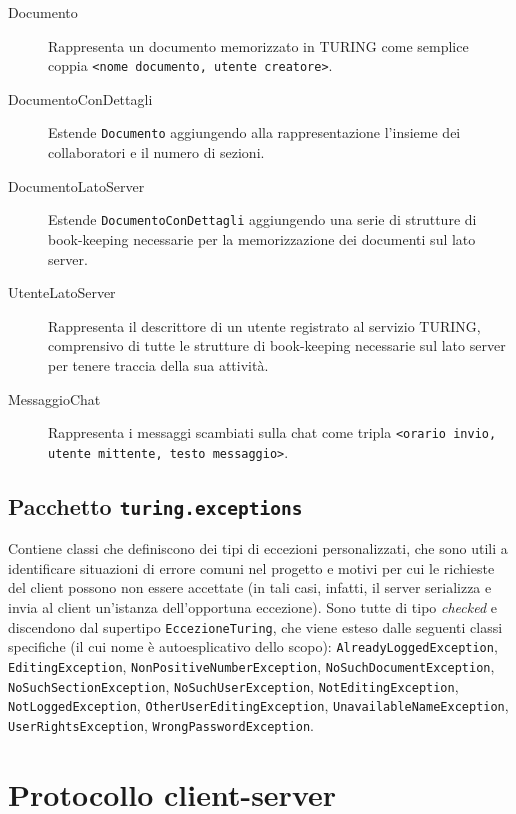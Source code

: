 \documentclass[a4paper,12pt]{article}
\begin{document}
  \begin{description}
  \item[Documento] Rappresenta un documento memorizzato in TURING come semplice coppia \texttt{<nome documento, utente creatore>}.
  \item[DocumentoConDettagli] Estende \texttt{Documento} aggiungendo alla rappresentazione l'insieme dei collaboratori e il numero di sezioni.
  \item[DocumentoLatoServer] Estende \texttt{DocumentoConDettagli} aggiungendo una serie di strutture di book-keeping necessarie per la memorizzazione dei documenti sul lato server.
  \item[UtenteLatoServer] Rappresenta il descrittore di un utente registrato al servizio TURING, comprensivo di tutte le strutture di book-keeping necessarie sul lato server per tenere traccia della sua attività.
  \item[MessaggioChat] Rappresenta i messaggi scambiati sulla chat come tripla \texttt{<orario invio, utente mittente, testo messaggio>}.
 \end{description}
 
 \subsection{ Pacchetto \texttt{turing.exceptions} }
 
  Contiene classi che definiscono dei tipi di eccezioni personalizzati, che sono utili a identificare situazioni di errore comuni nel progetto e motivi per cui le richieste del client possono non essere accettate (in tali casi, infatti, il server serializza e invia al client un'istanza dell'opportuna eccezione). Sono tutte di tipo \textit{checked} e discendono dal supertipo \texttt{EccezioneTuring}, che viene esteso dalle seguenti classi specifiche (il cui nome è autoesplicativo dello scopo):
  \texttt{AlreadyLoggedException},
  \texttt{EditingException},
  \texttt{NonPositiveNumberException},
  \texttt{NoSuchDocumentException},
  \texttt{NoSuchSectionException},
  \texttt{NoSuchUserException},
  \texttt{NotEditingException},
  \texttt{NotLoggedException},
  \texttt{OtherUserEditingException},
  \texttt{UnavailableNameException},
  \texttt{UserRightsException},
  \texttt{WrongPasswordException}.
 
 \section{ Protocollo client-server }
 
\end{document}

